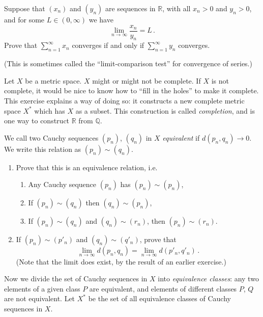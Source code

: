 \documentclass[12pt,letterpaper,reqno]{amsart}
\numberwithin{equation}{section}
\newcommand{\R}{\ensuremath{\mathbb R}}
\newcommand{\Q}{\ensuremath{\mathbb Q}}
\newcommand{\ti}[1]{\textit{#1}}
\begin{document}
\begin{exercise}[10 points]

Suppose that $(x_n)$ and $(y_n)$ are sequences in $\R$, with all $x_n > 0$ and $y_n > 0$, and for some $L \in 
(0,\infty)$
we have
$$
\lim_{n \to \infty} \frac{x_n}{y_n} = L \, .
$$
Prove that $\sum_{n=1}^\infty x_n$ converges if and only if 
$\sum_{n=1}^\infty y_n$ converges.

(This is sometimes called the ``limit-comparison test'' for convergence of series.)

\end{exercise}



\newpage

\begin{exercise}
Let $X$ be a metric space.
$X$ might or might not be complete.
If $X$ is not complete, it would be nice
to know how to ``fill in the holes'' to
make it complete.
This exercise explains a way of doing so:
it constructs a new complete 
metric space $X^*$
which has $X$ as a subset. This construction is called \ti{completion}, and is one way to construct $\R$ from $\Q$.

We call two Cauchy sequences $(p_n)$,
$(q_n)$ in $X$ 
\ti{equivalent} if $d(p_n, q_n) \to 0$.
We write this relation as $(p_n) \sim (q_n)$.
\begin{enumerate}
\item Prove that this 
is an equivalence relation, i.e.
\begin{enumerate}
\item Any Cauchy sequence $(p_n)$ 
has $(p_n) \sim (p_n)$,
\item If $(p_n) \sim (q_n)$ then $(q_n) \sim (p_n)$,
\item If $(p_n) \sim (q_n)$
and $(q_n) \sim (r_n)$,
then $(p_n) \sim (r_n)$.
\end{enumerate}

\item If $(p_n) \sim (p'_n)$
and $(q_n) \sim (q'_n)$,
prove that
$$
\lim_{n \to \infty} d(p_n,q_n) = \lim_{n \to \infty} d(p'_n,q'_n) \, .
$$
(Note that the limit does exist, by the
result of an earlier exercise.)
\end{enumerate}

Now we divide the set of Cauchy sequences in $X$ into \ti{equivalence classes}: 
any two elements of a given class $P$ are
equivalent, and elements of different
classes $P$, $Q$ are not equivalent.
Let $X^*$ be the set of all equivalence classes of Cauchy sequences in $X$. 


\end{exercise}
\end{document}
